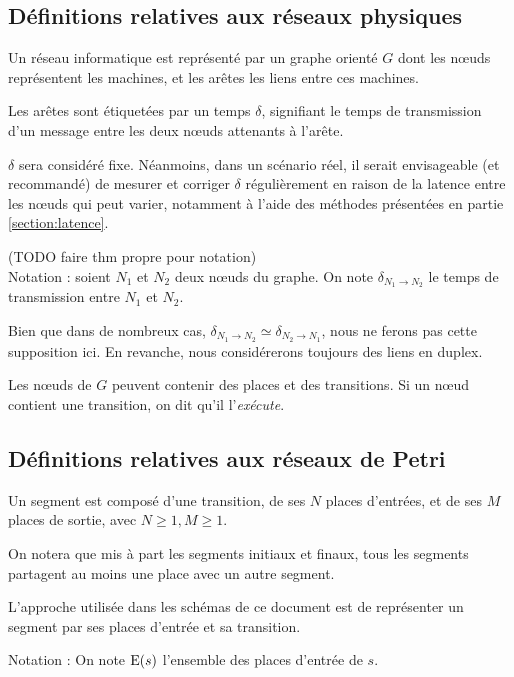 \subsection{Définitions relatives aux réseaux physiques}
\begin{mydef}
Un réseau informatique est représenté par un graphe orienté $G$ dont les nœuds représentent les machines, et les arêtes les liens entre ces machines. 

Les arêtes sont étiquetées par un temps $\delta$, signifiant le temps de transmission d'un message entre les deux nœuds attenants à l'arête.
\end{mydef}
$\delta$ sera considéré fixe. Néanmoins, dans un scénario réel, il serait envisageable (et recommandé) de mesurer et corriger $\delta$ régulièrement en raison de la latence entre les nœuds qui peut varier, notamment à l'aide des méthodes présentées en partie \ref{section:latence}.

(TODO faire thm propre pour notation) \\
Notation : soient $N_1$ et $N_2$ deux nœuds du graphe. On note $\delta_{N_1 \rightarrow N_2}$ le temps de transmission entre $N_1$ et $N_2$. 

Bien que dans de nombreux cas, $\delta_{N_1 \rightarrow N_2} \simeq \delta_{N_2 \rightarrow N_1}$, nous ne ferons pas cette supposition ici. En revanche, nous considérerons toujours des liens en duplex.

Les nœuds de $G$ peuvent contenir des places et des transitions. Si un nœud contient une transition, on dit qu'il l'\textit{exécute}.

\subsection{Définitions relatives aux réseaux de Petri}
\begin{mydef}
Un segment est composé d'une transition, de ses $N$ places d'entrées, et de ses $M$ places de sortie, avec $N \geq 1, M \geq 1$.
\end{mydef}

On notera que mis à part les segments initiaux et finaux, tous les segments partagent au moins une place avec un autre segment.

L'approche utilisée dans les schémas de ce document est de représenter un segment par ses places d'entrée et sa transition.

Notation : On note $\operatorname{E}(s)$ l'ensemble des places d'entrée de $s$.

